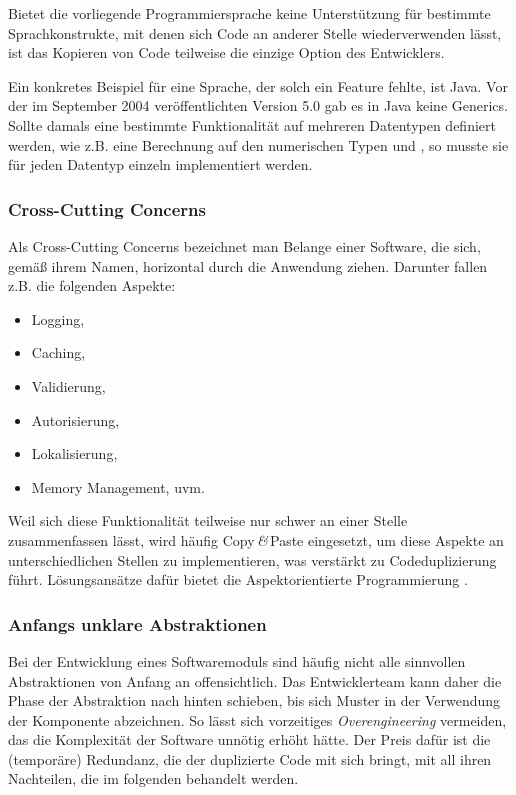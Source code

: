 Bietet die vorliegende Programmiersprache keine Unterstützung für bestimmte Sprachkonstrukte, mit denen sich Code an anderer Stelle wiederverwenden lässt, ist das Kopieren von Code teilweise die einzige Option des Entwicklers.

Ein konkretes Beispiel für eine Sprache, der solch ein Feature fehlte, ist Java. Vor der im September 2004 veröffentlichten Version 5.0 gab es in Java keine Generics. Sollte damals eine bestimmte Funktionalität auf mehreren Datentypen definiert werden, wie z.B. eine Berechnung auf den numerischen Typen  und , so musste sie für jeden Datentyp einzeln implementiert werden.


\subsubsection{Cross-Cutting Concerns}

Als Cross-Cutting Concerns bezeichnet man Belange einer Software, die sich, gemäß ihrem Namen, horizontal durch die Anwendung ziehen. Darunter fallen z.B. die folgenden Aspekte:

\begin{itemize}
  \item Logging,
  \item Caching,
  \item Validierung,
  \item Autorisierung,
  \item Lokalisierung,
  \item Memory Management, uvm.
\end{itemize}

Weil sich diese Funktionalität teilweise nur schwer an einer Stelle zusammenfassen lässt, wird häufig Copy\,\textit{\&}\,Paste eingesetzt, um diese Aspekte an unterschiedlichen Stellen zu implementieren, was verstärkt zu Codeduplizierung führt. Lösungsansätze dafür bietet die Aspektorientierte Programmierung \cite{Filman2005}.


\subsubsection{Anfangs unklare Abstraktionen}

Bei der Entwicklung eines Softwaremoduls sind häufig nicht alle sinnvollen Abstraktionen von Anfang an offensichtlich. Das Entwicklerteam kann daher die Phase der Abstraktion nach hinten schieben, bis sich Muster in der Verwendung der Komponente abzeichnen. So lässt sich vorzeitiges \textit{Overengineering} vermeiden, das die Komplexität der Software unnötig erhöht hätte. Der Preis dafür ist die (temporäre) Redundanz, die der duplizierte Code mit sich bringt,  mit all ihren Nachteilen, die im folgenden behandelt werden.


